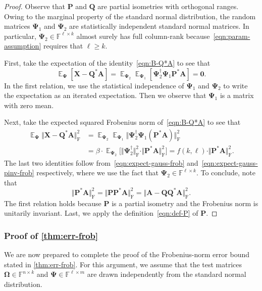 \documentclass[final]{siamart1116}
\numberwithin{equation}{section}
\numberwithin{theorem}{section}
\numberwithin{figure}{section}
\newcommand{\F}{\mathbb{F}}
\newcommand{\mtx}[1]{\bm{#1}}
\newcommand{\norm}[1]{\Vert #1 \Vert}
\newcommand{\fnorm}[1]{\norm{#1}_{\mathrm{F}}}
\newcommand{\fnormsq}[1]{\fnorm{#1}^2}
\newcommand{\Expect}{\operatorname{\mathbb{E}}}
\begin{document}
\begin{proof}
Observe that $\mtx{P}$ and $\mtx{Q}$ are partial isometries with orthogonal ranges.
Owing to the marginal property of the standard normal distribution,
the random matrices $\mtx{\Psi}_1$ and $\mtx{\Psi}_2$
are statistically independent standard normal matrices.
In particular, $\mtx{\Psi}_2 \in \F^{\ell \times k}$ almost surely has full column-rank
because~\cref{eqn:param-assumption} requires that $\ell \geq k$.

First, take the expectation of the identity~\cref{eqn:B-Q*A} to see that
$$
\Expect_{\mtx{\Psi}}[ \mtx{X} -  \mtx{Q}^* \mtx{A} ]
	= \Expect_{\mtx{\Psi}_2}\Expect_{\mtx{\Psi}_1} [ \mtx{\Psi}_2^\dagger \mtx{\Psi}_1 \mtx{P}^* \mtx{A} ]
	= \mtx{0}.
$$
In the first relation, we use the statistical
independence of $\mtx{\Psi}_1$ and $\mtx{\Psi}_2$
to write the expectation as an iterated expectation.
Then we observe that $\mtx{\Psi}_1$ is a matrix with zero mean.

Next, take the expected squared Frobenius norm of~\cref{eqn:B-Q*A} to see that
$$
\begin{aligned}
\Expect_{\mtx{\Psi}} \fnormsq{ \mtx{X} - \mtx{Q}^* \mtx{A} }
	&= \Expect_{\mtx{\Psi}_2} \Expect_{\mtx{\Psi}_1} \fnormsq{ \mtx{\Psi}_2^\dagger \mtx{\Psi}_1 (\mtx{P}^* \mtx{A}) } \\
	&= \beta \cdot \Expect_{\mtx{\Psi}_2} \big[ \fnormsq{\mtx{\Psi}_2^\dagger} \cdot \fnormsq{\mtx{P}^* \mtx{A}} \big]
	= f(k, \ell) \cdot  \fnormsq{\mtx{P}^*\mtx{A}}.
\end{aligned}
$$
The last two identities follow from~\cref{eqn:expect-gauss-frob}
and~\cref{eqn:expect-gauss-pinv-frob} respectively,
where we use the fact that $\mtx{\Psi}_2 \in \F^{\ell \times k}$.
To conclude, note that
$$
\fnormsq{\mtx{P}^*\mtx{A}} = \fnormsq{\mtx{PP}^*\mtx{A} }
	= \fnormsq{\mtx{A} - \mtx{QQ}^* \mtx{A} }.
$$
The first relation holds because $\mtx{P}$ is a partial isometry and the Frobenius
norm is unitarily invariant.  Last, we apply the definition~\cref{eqn:def-P} of $\mtx{P}$.
\end{proof}


\subsubsection{Proof of \cref{thm:err-frob}}

We are now prepared to complete the proof of
the Frobenius-norm error bound stated in \cref{thm:err-frob}.
For this argument, we assume that the test matrices
$\mtx{\Omega}\in \F^{n \times k}$ and $\mtx{\Psi} \in \F^{\ell \times m}$
are drawn independently from the standard normal distribution.
\end{document}
